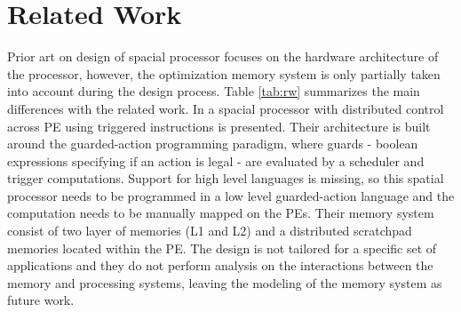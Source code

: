 
\section{Related Work}






Prior art on design of spacial processor focuses on the hardware architecture of the processor, however, the optimization memory system is only partially taken into account during the design process.
Table \ref{tab:rw} summarizes the main differences with the related work.
In \cite{parashar2014efficient} a spacial processor with distributed control across PE using triggered instructions is presented. Their architecture is built around the guarded-action programming paradigm, where guards - boolean expressions specifying if an action is legal - are evaluated by a scheduler and trigger computations. Support for high level languages is missing, so this spatial processor needs to be programmed in a low level guarded-action language and the computation needs to be manually mapped on the PEs. Their memory system consist of two layer of memories (L1 and L2) and a distributed scratchpad memories located within the PE. The design is not tailored for a specific set of applications and they do not perform analysis on the interactions between the memory and processing systems, leaving the modeling of the memory system as future work.

